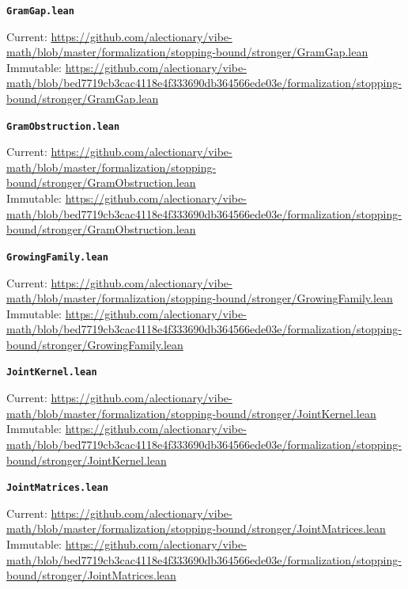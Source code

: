 \smallskip
\medskip
\par\noindent\textbf{\texttt{GramGap.lean}}\par\nopagebreak
{\footnotesize\noindent Current: \url{https://github.com/alectionary/vibe-math/blob/master/formalization/stopping-bound/stronger/GramGap.lean}\\
Immutable: \url{https://github.com/alectionary/vibe-math/blob/bed7719cb3cac4118e4f333690db364566ede03e/formalization/stopping-bound/stronger/GramGap.lean}\par}
\smallskip
\medskip
\par\noindent\textbf{\texttt{GramObstruction.lean}}\par\nopagebreak
{\footnotesize\noindent Current: \url{https://github.com/alectionary/vibe-math/blob/master/formalization/stopping-bound/stronger/GramObstruction.lean}\\
Immutable: \url{https://github.com/alectionary/vibe-math/blob/bed7719cb3cac4118e4f333690db364566ede03e/formalization/stopping-bound/stronger/GramObstruction.lean}\par}
\smallskip
\medskip
\par\noindent\textbf{\texttt{GrowingFamily.lean}}\par\nopagebreak
{\footnotesize\noindent Current: \url{https://github.com/alectionary/vibe-math/blob/master/formalization/stopping-bound/stronger/GrowingFamily.lean}\\
Immutable: \url{https://github.com/alectionary/vibe-math/blob/bed7719cb3cac4118e4f333690db364566ede03e/formalization/stopping-bound/stronger/GrowingFamily.lean}\par}
\smallskip
\medskip
\par\noindent\textbf{\texttt{JointKernel.lean}}\par\nopagebreak
{\footnotesize\noindent Current: \url{https://github.com/alectionary/vibe-math/blob/master/formalization/stopping-bound/stronger/JointKernel.lean}\\
Immutable: \url{https://github.com/alectionary/vibe-math/blob/bed7719cb3cac4118e4f333690db364566ede03e/formalization/stopping-bound/stronger/JointKernel.lean}\par}
\smallskip
\medskip
\par\noindent\textbf{\texttt{JointMatrices.lean}}\par\nopagebreak
{\footnotesize\noindent Current: \url{https://github.com/alectionary/vibe-math/blob/master/formalization/stopping-bound/stronger/JointMatrices.lean}\\
Immutable: \url{https://github.com/alectionary/vibe-math/blob/bed7719cb3cac4118e4f333690db364566ede03e/formalization/stopping-bound/stronger/JointMatrices.lean}\par}
